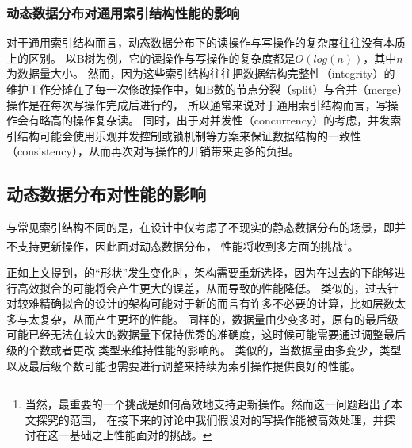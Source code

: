 

\subsubsection{动态数据分布对通用索引结构性能的影响}

对于通用索引结构而言，动态数据分布下的读操作与写操作的复杂度往往没有本质上的区别。
以B树为例，它的读操作与写操作的复杂度都是$O(log(n))$，其中$n$为数据量大小。
然而，因为这些索引结构往往把数据结构完整性（integrity）的维护工作分摊在了每一次修改操作中，如B数的节点分裂（split）与合并（merge）操作是在每次写操作完成后进行的，
所以通常来说对于通用索引结构而言，写操作会有略高的操作复杂读。
同时，出于对并发性（concurrency）的考虑，并发索引结构可能会使用乐观并发控制或锁机制等方案来保证数据结构的一致性（consistency），从而再次对写操作的开销带来更多的负担。

\subsection{动态数据分布对{\li}性能的影响}
\label{sec:dist-affect-li}

与常见索引结构不同的是，{\li}在设计中仅考虑了不现实的静态数据分布的场景，即{\li}并不支持更新操作，因此面对动态数据分布，
{\li}性能将收到多方面的挑战\footnote{当然，最重要的一个挑战是如何高效地支持更新操作。然而这一问题超出了本文探究的范围，
在接下来的讨论中我们假设对{\li}的写操作能被高效处理，并探讨在这一基础之上{\li}性能面对的挑战。}。

正如上文提到，{\cdf}的“形状”发生变化时，{\rmi}架构需要重新选择，因为在过去的{\cdf}下能够进行高效拟合的{\model}可能将会产生更大的误差，从而导致{\li}的性能降低。
类似的，过去针对较难精确拟合的{\cdf}设计的{\rmi}架构可能对于新的{\cdf}而言有许多不必要的计算，比如{\rmi}层数太多与{\model}太复杂，从而产生更坏的{\li}性能。
同样的，数据量由少变多时，原有的{\rmi}最后级{\model}可能已经无法在较大的数据量下保持优秀的准确度，这时候可能需要通过调整{\rmi}最后级{\model}的个数或者更改{\model}类型来维持{\li}性能的影响的。
类似的，当数据量由多变少，{\model}类型以及{\rmi}最后级{\model}个数可能也需要进行调整来持续为索引操作提供良好的性能。

